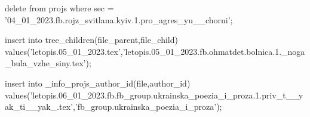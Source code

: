  
 
 
 
 

delete from projs where sec = '04_01_2023.fb.rojz_svitlana.kyiv.1.pro_agres_yu__chorni';

insert into tree_children(file_parent,file_child) values('letopis.05_01_2023.tex','letopis.05_01_2023.fb.ohmatdet.bolnica.1._noga_bula_vzhe_siny.tex');

insert into _info_projs_author_id(file,author_id)
values('letopis.06_01_2023.fb.fb_group.ukrainska_poezia_i_proza.1.priv_t__yak_ti__yak_.tex','fb_group.ukrainska_poezia_i_proza');
